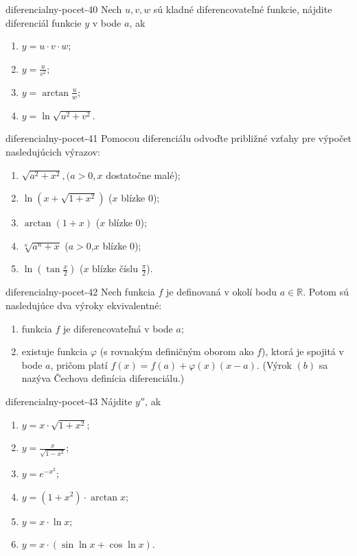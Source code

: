 \begin{defproblem}{diferencialny-pocet-40}
Nech $u,v,w$ sú kladné diferencovateľné funkcie, nájdite diferenciál funkcie $y$ v bode $a$, ak
\begin{multicols}{2}
\begin{enumerate}
    \item $y=u\cdot v\cdot w$;
    \item $y=\frac{u}{v^2}$;
    \item $y=\arctan \frac{u}{w}$;
    \item $y=\ln \sqrt{u^2+v^2}$.
\end{enumerate}
\end{multicols}
\end{defproblem}

\begin{defproblem}{diferencialny-pocet-41}
Pomocou diferenciálu odvoďte približné vzťahy pre výpočet nasledujúcich výrazov:
\begin{enumerate}
\item $\sqrt{a^2+x^2},(a>0,x$ dostatočne malé);
\item $\ln (x+\sqrt{1+x^2})$ ($x$ blízke $0$);
\item $\arctan (1+x)$ ($x$ blízke $0$);
\item $\sqrt[n]{a^n+x}$ ($a>0$,$x$ blízke $0$);
\item$\ln (\tan \frac{x}{2})$ ($x$ blízke číslu $\frac{\pi}{2}$).
\end{enumerate}
\end{defproblem}

\begin{defproblem}{diferencialny-pocet-42}
Nech funkcia $f$ je definovaná v okolí bodu $a\in\mathbb{R}$. Potom sú nasledujúce dva výroky ekvivalentné:
\begin{enumerate}
\item funkcia $f$ je diferencovateľná v bode $a$;
\item existuje funkcia $\varphi$ (s rovnakým definičným oborom ako $f$), ktorá je spojitá v bode $a$, pričom platí $f(x)=f(a)+\varphi(x)(x-a)$.
(Výrok $(b)$ sa nazýva Čechova definícia diferenciálu.)
\end{enumerate}
\end{defproblem}

\begin{defproblem}{diferencialny-pocet-43}
Nájdite $y''$, ak
\begin{multicols}{2}
\begin{enumerate}
    \item $y=x\cdot \sqrt{1+x^2}$;
    \item $y=\frac{x}{\sqrt{1-x^2}}$;
    \item $y=e^{-x^2}$;
    \item $y=(1+x^2)\cdot \arctan x$;
    \item $y=x\cdot \ln x$;
    \item $y=x\cdot(\sin \ln x+\cos \ln x)$.
\end{enumerate}
\end{multicols}
\end{defproblem}

